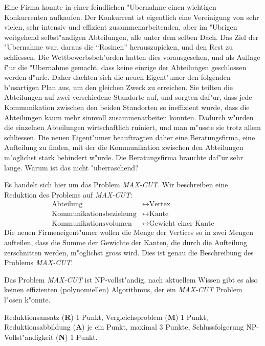 Eine Firma konnte in einer feindlichen "Ubernahme einen wichtigen Konkurrenten
aufkaufen. Der Konkurrent ist eigentlich eine Vereinigung von sehr vielen,
sehr intensiv und effizient zusammenarbeitenden, aber im "Ubrigen weitgehend
selbst"andigen Abteilungen, alle unter dem selben Dach.
Das Ziel der "Ubernahme war, daraus die ``Rosinen'' herauszupicken, und
den Rest zu schliessen. Die Wettbewerbsbeh"orden hatten dies vorausgesehen,
und als Auflage f"ur die "Ubernahme gemacht, dass keine einzige der Abteilungen
geschlossen werden d"urfe.
Daher dachten sich die neuen Eigent"umer den folgenden b"osartigen Plan aus,
um den gleichen Zweck zu erreichen. Sie teilten die Abteilungen auf zwei 
verschiedene Standorte auf, und sorgten daf"ur, dass jede Kommunikation zwischen
den beiden Standorten so ineffizient wurde, dass die Abteilungen kaum mehr
sinnvoll zusammenarbeiten konnten.
Dadurch w"urden die einzelnen Abteilungen wirtschaftlich ruiniert, und man
m"usste sie trotz allem schliessen.
Die neuen Eigent"umer beauftragten daher eine Beratungsfirma, eine
Aufteilung zu finden, mit der die Kommunikation zwischen den Abteilungen
m"oglichst stark behindert w"urde.
Die Beratungsfirma brauchte daf"ur sehr lange. Warum ist das nicht
"uberraschend?

\begin{loesung}
Es handelt sich hier um das Problem \textsl{MAX-CUT}.
Wir beschreiben eine Reduktion des Problems auf \textsl{MAX-CUT}:
\begin{align*}
\text{Abteilung}&\leftrightarrow \text{Vertex} \\
\text{Kommunikationsbeziehung}&\leftrightarrow \text{Kante} \\
\text{Kommunikationsvolumen}&\leftrightarrow \text{Gewicht einer Kante}
\end{align*}
Die neuen Firmeneigent"umer wollen die Menge der Vertices so in zwei
Mengen aufteilen, dass die Summe der Gewichte der Kanten, die durch die
Aufteilung zerschnitten werden, m"oglichst
gross wird. Dies ist genau die Beschreibung des Problems \textsl{MAX-CUT}.

Das Problem \textsl{MAX-CUT} ist NP-vollst"andig, nach aktuellem Wissen
gibt es also keinen effizienten (polynomiellen) Algorithmus, der ein
\textsl{MAX-CUT} Problem l"osen k"onnte.
\end{loesung}

\begin{bewertung}
Reduktionsansatz ({\bf R}) 1 Punkt,
Vergleichsproblem ({\bf M}) 1 Punkt,
Reduktionsabbildung ({\bf A}) je ein Punkt, maximal 3 Punkte,
Schlussfolgerung NP-Vollst"andigkeit ({\bf N}) 1 Punkt.
\end{bewertung}

